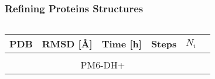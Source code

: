 \documentclass[12pt]{beamer}
\begin{document}
\begin{frame}

    \frametitle{Refining Proteins Structures}







    \begin{columns}


        \centering

        \begin{tabular}{@{} l r r r r r @{} }

            PDB & RMSD [\AA] & Time [h] & Steps & $N_i$\\

            \midrule

            &&\\

            \multicolumn{5}{c}{ \small PM6-DH+} \\

            \midrule



\end{tabular}
\end{columns}
\end{frame}
\end{document}
